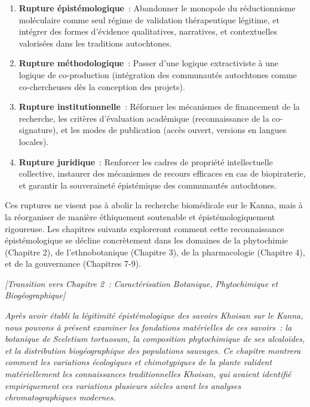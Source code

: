 \documentclass[12pt,a4paper,twoside]{book}
\newcommand{\kanna}{\textit{Sceletium tortuosum}}
\begin{document}
\begin{enumerate}
\item \textbf{Rupture épistémologique}~: Abandonner le monopole du réductionnisme moléculaire comme seul régime de validation thérapeutique légitime, et intégrer des formes d'évidence qualitatives, narratives, et contextuelles valorisées dans les traditions autochtones.

\item \textbf{Rupture méthodologique}~: Passer d'une logique extractiviste à une logique de co-production (intégration des communautés autochtones comme co-chercheuses dès la conception des projets).

\item \textbf{Rupture institutionnelle}~: Réformer les mécanismes de financement de la recherche, les critères d'évaluation académique (reconnaissance de la co-signature), et les modes de publication (accès ouvert, versions en langues locales).

\item \textbf{Rupture juridique}~: Renforcer les cadres de propriété intellectuelle collective, instaurer des mécanismes de recours efficaces en cas de biopiraterie, et garantir la souveraineté épistémique des communautés autochtones.
\end{enumerate}

Ces ruptures ne visent pas à abolir la recherche biomédicale sur le Kanna, mais à la réorganiser de manière éthiquement soutenable et épistémologiquement rigoureuse. Les chapitres suivants exploreront comment cette reconnaissance épistémologique se décline concrètement dans les domaines de la phytochimie (Chapitre 2), de l'ethnobotanique (Chapitre 3), de la pharmacologie (Chapitre 4), et de la gouvernance (Chapitres 7-9).

\textit{[Transition vers Chapitre 2~: Caractérisation Botanique, Phytochimique et Biogéographique]}

\textit{Après avoir établi la légitimité épistémologique des savoirs Khoisan sur le Kanna, nous pouvons à présent examiner les fondations matérielles de ces savoirs~: la botanique de} \kanna{}\textit{, la composition phytochimique de ses alcaloïdes, et la distribution biogéographique des populations sauvages. Ce chapitre montrera comment les variations écologiques et chimotypiques de la plante valident matériellement les connaissances traditionnelles Khoisan, qui avaient identifié empiriquement ces variations plusieurs siècles avant les analyses chromatographiques modernes.}


\printbibliography[heading=bibintoc,title={Bibliographie}]
\end{document}
